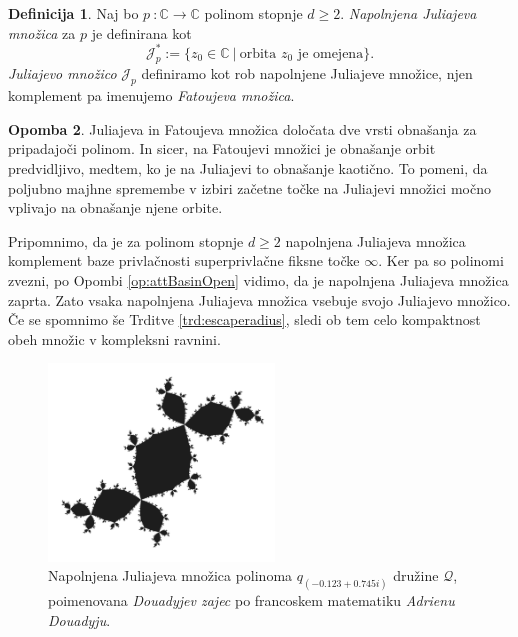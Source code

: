\documentclass[12pt,a4paper]{amsart}
\theoremstyle{definition} %
\newtheorem{definicija}{Definicija}[section]
\newtheorem{opomba}[definicija]{Opomba}
\theoremstyle{plain} %
\newcommand{\CC}{\mathbb C}
\newcommand{\J}{\mathscr J} %
\newcommand{\QQ}{\mathscr Q} %
\begin{document}
\begin{definicija} \label {def:Julia}
Naj bo $p \: \colon \CC \to \CC$ polinom stopnje $d\geq2$. 
{\em Napolnjena Juliajeva množica} za $p$ je definirana kot 
$$\J_p^\ast := \{z_0 \in \CC \: | \: \text{orbita $z_0$ je omejena}\}.$$
{\em Juliajevo množico} $\J_p$ definiramo kot rob napolnjene Juliajeve množice,
njen komplement pa imenujemo {\em Fatoujeva množica}.
\end{definicija}

\begin{opomba}
Juliajeva in Fatoujeva množica določata dve vrsti obnašanja za pripadajoči polinom.
In sicer, na Fatoujevi množici je obnašanje orbit predvidljivo, medtem, ko je na Juliajevi to obnašanje kaotično.
To pomeni, da poljubno majhne spremembe v izbiri začetne točke na Juliajevi množici
močno vplivajo na obnašanje njene orbite.
\end{opomba}

\noindent Pripomnimo, da je za polinom stopnje $d\geq2$ napolnjena Juliajeva množica komplement baze privlačnosti
superprivlačne fiksne točke $\infty$. 
Ker pa so polinomi zvezni, po Opombi \ref{op:attBasinOpen} vidimo, da je napolnjena Juliajeva množica zaprta. 
Zato vsaka napolnjena Juliajeva množica vsebuje svojo Juliajevo množico.
Če se spomnimo še Trditve \ref{trd:escaperadius}, sledi ob tem celo kompaktnost obeh množic v kompleksni ravnini.

\begin{figure}[h]
\includegraphics[width=6cm]{graphics/douadyRabbitGray.png}
\caption{
Napolnjena Juliajeva množica polinoma $q_{(-0.123+0.745i)}$ družine $\QQ$,
poimenovana {\em Douadyjev zajec} po francoskem matematiku {\em Adrienu Douadyju}.
}
\label{img:DouadyRabbit}
\end{figure}
\end{document}
